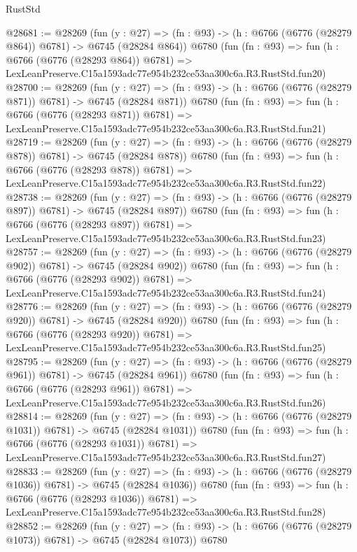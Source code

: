 \begin{lexlean}{RustStd}
\begin{coremodule}
@28681 := @28269
    (fun (y : @27) => (fn : @93) -> (h : @6766 (@6776 (@28279 @864)) @6781) -> @6745 (@28284 @864))
    @6780
    (fun (fn : @93) =>
    fun (h : @6766 (@6776 (@28293 @864)) @6781) =>
    LexLeanPreserve.C15a1593adc77e954b232ce53aa300c6a.R3.RustStd.fun20)
@28700 := @28269
    (fun (y : @27) => (fn : @93) -> (h : @6766 (@6776 (@28279 @871)) @6781) -> @6745 (@28284 @871))
    @6780
    (fun (fn : @93) =>
    fun (h : @6766 (@6776 (@28293 @871)) @6781) =>
    LexLeanPreserve.C15a1593adc77e954b232ce53aa300c6a.R3.RustStd.fun21)
@28719 := @28269
    (fun (y : @27) => (fn : @93) -> (h : @6766 (@6776 (@28279 @878)) @6781) -> @6745 (@28284 @878))
    @6780
    (fun (fn : @93) =>
    fun (h : @6766 (@6776 (@28293 @878)) @6781) =>
    LexLeanPreserve.C15a1593adc77e954b232ce53aa300c6a.R3.RustStd.fun22)
@28738 := @28269
    (fun (y : @27) => (fn : @93) -> (h : @6766 (@6776 (@28279 @897)) @6781) -> @6745 (@28284 @897))
    @6780
    (fun (fn : @93) =>
    fun (h : @6766 (@6776 (@28293 @897)) @6781) =>
    LexLeanPreserve.C15a1593adc77e954b232ce53aa300c6a.R3.RustStd.fun23)
@28757 := @28269
    (fun (y : @27) => (fn : @93) -> (h : @6766 (@6776 (@28279 @902)) @6781) -> @6745 (@28284 @902))
    @6780
    (fun (fn : @93) =>
    fun (h : @6766 (@6776 (@28293 @902)) @6781) =>
    LexLeanPreserve.C15a1593adc77e954b232ce53aa300c6a.R3.RustStd.fun24)
@28776 := @28269
    (fun (y : @27) => (fn : @93) -> (h : @6766 (@6776 (@28279 @920)) @6781) -> @6745 (@28284 @920))
    @6780
    (fun (fn : @93) =>
    fun (h : @6766 (@6776 (@28293 @920)) @6781) =>
    LexLeanPreserve.C15a1593adc77e954b232ce53aa300c6a.R3.RustStd.fun25)
@28795 := @28269
    (fun (y : @27) => (fn : @93) -> (h : @6766 (@6776 (@28279 @961)) @6781) -> @6745 (@28284 @961))
    @6780
    (fun (fn : @93) =>
    fun (h : @6766 (@6776 (@28293 @961)) @6781) =>
    LexLeanPreserve.C15a1593adc77e954b232ce53aa300c6a.R3.RustStd.fun26)
@28814 := @28269
    (fun (y : @27) =>
    (fn : @93) -> (h : @6766 (@6776 (@28279 @1031)) @6781) -> @6745 (@28284 @1031))
    @6780
    (fun (fn : @93) =>
    fun (h : @6766 (@6776 (@28293 @1031)) @6781) =>
    LexLeanPreserve.C15a1593adc77e954b232ce53aa300c6a.R3.RustStd.fun27)
@28833 := @28269
    (fun (y : @27) =>
    (fn : @93) -> (h : @6766 (@6776 (@28279 @1036)) @6781) -> @6745 (@28284 @1036))
    @6780
    (fun (fn : @93) =>
    fun (h : @6766 (@6776 (@28293 @1036)) @6781) =>
    LexLeanPreserve.C15a1593adc77e954b232ce53aa300c6a.R3.RustStd.fun28)
@28852 := @28269
    (fun (y : @27) =>
    (fn : @93) -> (h : @6766 (@6776 (@28279 @1073)) @6781) -> @6745 (@28284 @1073))
    @6780

\end{coremodule}
\end{lexlean}
